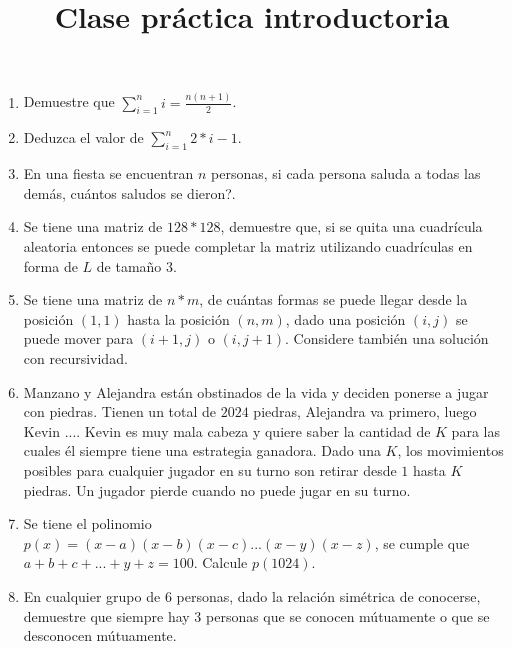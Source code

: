 \documentclass{article}
\begin{document}
\title{Clase pr\'actica introductoria}
\maketitle

\begin{enumerate}
    \item Demuestre que $\sum_{i=1}^{n} i = \frac{n(n+1)}{2}$.
    \item Deduzca el valor de $\sum_{i=1}^{n} 2*i - 1$.
    \item En una fiesta se encuentran $n$ personas, si cada persona saluda a todas las dem\'as, cu\'antos saludos se dieron?.
    \item Se tiene una matriz de $128 * 128$, demuestre que, si se quita una cuadr\'icula aleatoria entonces se puede completar la matriz utilizando cuadr\'iculas en forma de $L$ de tamaño 3.
    \item Se tiene una matriz de $n * m$, de cu\'antas formas se puede llegar desde la posici\'on $(1, 1)$ hasta la posici\'on $(n, m)$, dado una posici\'on $(i, j)$ se puede mover para $(i+1, j)$ o $(i, j+1)$. Considere tambi\'en una soluci\'on con recursividad.
    \item Manzano y Alejandra est\'an obstinados de la vida y deciden ponerse a jugar con piedras. Tienen un total de $2024$ piedras, Alejandra va primero, luego Kevin .... Kevin es muy mala cabeza y quiere saber la cantidad de $K$ para las cuales \'el siempre tiene una estrategia ganadora. Dado una $K$, los movimientos posibles para cualquier jugador en su turno son retirar desde $1$ hasta $K$ piedras. Un jugador pierde cuando no puede jugar en su turno.
    \item Se tiene el polinomio $p(x) = (x-a)(x-b)(x-c)...(x-y)(x-z)$, se cumple que $a+b+c+...+y+z=100$. Calcule $p(1024)$.
    \item En cualquier grupo de $6$ personas, dado la relaci\'on sim\'etrica de conocerse, demuestre que siempre hay $3$ personas que se conocen m\'utuamente o que se desconocen m\'utuamente.
\end{enumerate}
\end{document}
